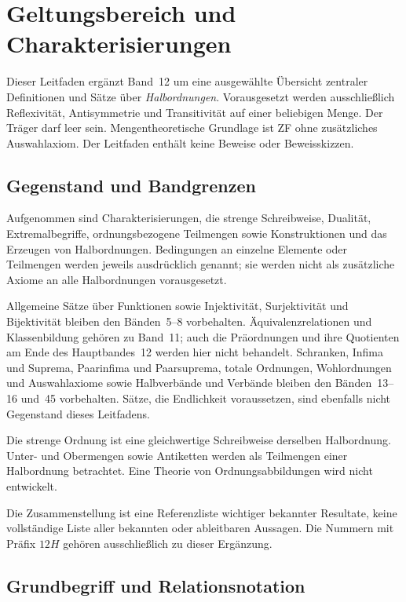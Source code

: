 \chapter{Geltungsbereich und Charakterisierungen}
\label{b12guide:ch:foundations}

Dieser Leitfaden ergänzt Band~12 um eine ausgewählte Übersicht
zentraler Definitionen und Sätze über \emph{Halbordnungen}.
Vorausgesetzt werden ausschließlich Reflexivität, Antisymmetrie
und Transitivität auf einer beliebigen Menge. Der Träger darf leer
sein. Mengentheoretische Grundlage ist ZF ohne zusätzliches
Auswahlaxiom. Der Leitfaden enthält keine Beweise oder Beweisskizzen.

\section{Gegenstand und Bandgrenzen}

Aufgenommen sind Charakterisierungen, die strenge Schreibweise,
Dualität, Extremalbegriffe, ordnungsbezogene Teilmengen sowie
Konstruktionen und das Erzeugen von Halbordnungen. Bedingungen
an einzelne Elemente oder Teilmengen werden jeweils ausdrücklich
genannt; sie werden nicht als zusätzliche Axiome an alle
Halbordnungen vorausgesetzt.

Allgemeine Sätze über Funktionen sowie Injektivität, Surjektivität
und Bijektivität bleiben den Bänden~5--8 vorbehalten.
Äquivalenzrelationen und Klassenbildung gehören zu Band~11;
auch die Präordnungen und ihre Quotienten am Ende des Hauptbandes~12
werden hier nicht behandelt.
Schranken, Infima und Suprema, Paarinfima und Paarsuprema,
totale Ordnungen, Wohlordnungen und Auswahlaxiome sowie
Halbverbände und Verbände bleiben den Bänden~13--16 und~45
vorbehalten. Sätze, die Endlichkeit voraussetzen, sind ebenfalls
nicht Gegenstand dieses Leitfadens.

Die strenge Ordnung ist eine gleichwertige Schreibweise derselben
Halbordnung. Unter- und Obermengen sowie Antiketten werden als
Teilmengen einer Halbordnung betrachtet. Eine Theorie von
Ordnungsabbildungen wird nicht entwickelt.

Die Zusammenstellung ist eine Referenzliste wichtiger bekannter
Resultate, keine vollständige Liste aller bekannten oder ableitbaren
Aussagen. Die Nummern mit Präfix $12H$ gehören ausschließlich
zu dieser Ergänzung.

\section{Grundbegriff und Relationsnotation}

